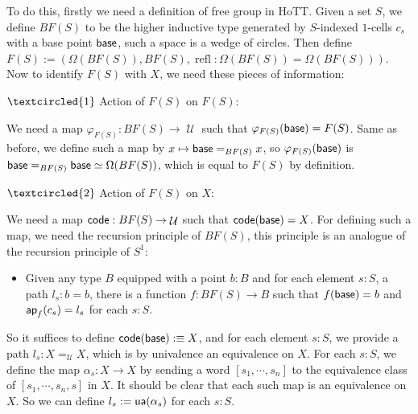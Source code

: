 \documentclass[11pt]{article}
\DeclareMathOperator{\refl}{refl}
\DeclareMathOperator{\cu}{\mathcal U}
\DeclareMathOperator{\base}{\sf base}
\DeclareMathOperator{\ap}{\sf ap}
\DeclareMathOperator{\code}{\sf code}
\DeclareMathOperator{\ua}{\sf ua}
\theoremstyle{definition}
\begin{document}



To do this, firstly we need a definition of free group in HoTT. Given a set $S$, we define $BF(S)$ to be the higher inductive type generated by $S$-indexed $1$-cells $c_s$ with a base point $\base$, such a space is a wedge of circles. Then define $F(S):= (\Omega (BF(S)),BF(S),\refl:\Omega (BF(S))=\Omega (BF(S)))$. Now to identify $F(S)$ with $X$, we need these pieces of information:

$\textcircled{1}$ Action of $F(S)$ on $F(S)$:

We need a map $\varphi_{F(S)}:BF(S)\to \cu$ such that $\varphi_{F(S)}(\base)= F(S)$. Same as before, we define such a map by $x\mapsto \base =_{BF(S)}x$, so $\varphi_{F(S)}(\base)$ is $\base=_{BF(S)}\base\simeq \Omega (BF(S))$, which is equal to $F(S)$ by definition.

$\textcircled{2}$ Action of $F(S)$ on $X$:

We need a map $\code:BF(S)\to \cu$ such that $\code(\base)= X$. For defining such a map, we need the recursion principle of $BF(S)$, this principle is an analogue of the recursion principle of $S^1$:
\begin{itemize}
\item Given any type $B$ equipped with a point $b: B$ and for each element $s:S$, a path $l_s:b=b$, there is a function $f:BF(S)\to B$ such that $f(\base)= b$ and $\ap_f(c_s)=l_s$ for each $s:S$.
\end{itemize}
So it suffices to define $\code (\base) :\equiv X$, and for each element $s:S$, we provide a path $l_s:X=_{\cu}X$, which is by univalence an equivalence on $X$. For each $s:S$, we define the map $\alpha_s:X\to X$ by sending a word $[s_1,\cdots,s_n]$ to the equivalence class of $[s_1,\cdots,s_n,s]$ in $X$. It should be clear that each such map is an equivalence on $X$. So we can define $l_s:= \ua(\alpha_s)$ for each $s:S$.
\end{document}
